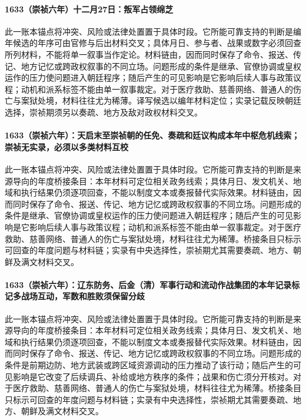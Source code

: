 \paragraph{1633（崇祯六年）十二月27日：叛军占领绵芝} 此一账本锚点将冲突、风险或法律处置置于具体时段。它所能可靠支持的判断是编年候选的年序可由官修与后出材料交叉；具体月日、参与者、战果或数字必须回查所列材料，不能将单一叙事当作定论。材料链由，因而同时保存了命令、报送、传记、地方记忆或跨政权叙事的不同立场。问题形成的条件是继承、官僚协调或皇权运作的压力使问题进入朝廷程序；随后产生的可见影响是它影响后续人事与政策议程；动机和派系标签不能由单一叙事裁定。对于医疗救助、慈善网络、普通人的伤亡与案狱处境，材料往往尤为稀薄。译写候选以编年材料定位；实录记载反映朝廷选择，崇祯期须另以奏疏、地方及敌对政权材料交叉。

\paragraph{1633（崇祯六年）：天启末至崇祯朝的任免、奏疏和廷议构成本年中枢危机线索；崇祯无实录，必须以多类材料互校} 此一账本锚点将冲突、风险或法律处置置于具体时段。它所能可靠支持的判断是来源导向的年度桥接条目：本年材料可定位相关政务线索；具体月日、发文机关、地域和执行结果仍须逐项回查，不能以制度文本或奏报替代实际效果。材料链由，因而同时保存了命令、报送、传记、地方记忆或跨政权叙事的不同立场。问题形成的条件是继承、官僚协调或皇权运作的压力使问题进入朝廷程序；随后产生的可见影响是它影响后续人事与政策议程；动机和派系标签不能由单一叙事裁定。对于医疗救助、慈善网络、普通人的伤亡与案狱处境，材料往往尤为稀薄。桥接条目只标示可回查的年度问题与材料链；实录有中央选择性，崇祯期尤其需要奏疏、地方、朝鲜及满文材料交叉。

\paragraph{1633（崇祯六年）：辽东防务、后金（清）军事行动和流动作战集团的本年记录标记多战场互动，军数和胜败须保留分歧} 此一账本锚点将冲突、风险或法律处置置于具体时段。它所能可靠支持的判断是来源导向的年度桥接条目：本年材料可定位相关政务线索；具体月日、发文机关、地域和执行结果仍须逐项回查，不能以制度文本或奏报替代实际效果。材料链由，因而同时保存了命令、报送、传记、地方记忆或跨政权叙事的不同立场。问题形成的条件是前期边防、地方武装或跨区域资源调动的压力推动了该行动；随后产生的可见影响是它改变了后续调兵、补给或地方秩序的条件；战果和伤亡须分开核对。对于医疗救助、慈善网络、普通人的伤亡与案狱处境，材料往往尤为稀薄。桥接条目只标示可回查的年度问题与材料链；实录有中央选择性，崇祯期尤其需要奏疏、地方、朝鲜及满文材料交叉。

